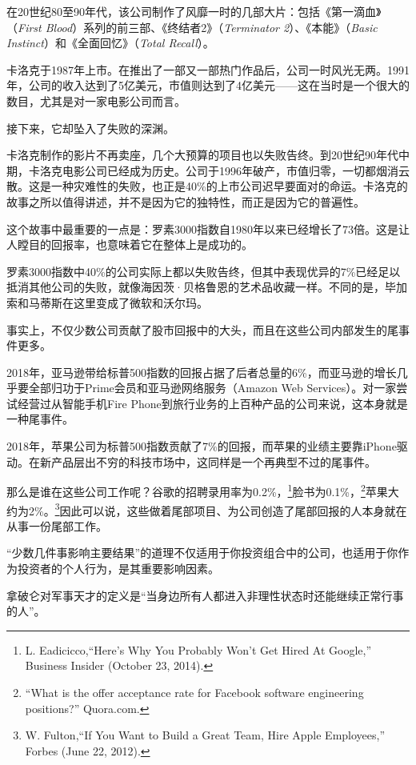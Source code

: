 在20世纪80至90年代，该公司制作了风靡一时的几部大片：包括《第一滴血》（\textit{First Blood}）系列的前三部、《终结者2》（\textit{Terminator 2}）、《本能》（\textit{Basic Instinct}）和《全面回忆》（\textit{Total Recall}）。

卡洛克于1987年上市。在推出了一部又一部热门作品后，公司一时风光无两。1991年，公司的收入达到了5亿美元，市值则达到了4亿美元——这在当时是一个很大的数目，尤其是对一家电影公司而言。

接下来，它却坠入了失败的深渊。

卡洛克制作的影片不再卖座，几个大预算的项目也以失败告终。到20世纪90年代中期，卡洛克电影公司已经成为历史。公司于1996年破产，市值归零，一切都烟消云散。这是一种灾难性的失败，也正是40\%的上市公司迟早要面对的命运。卡洛克的故事之所以值得讲述，并不是因为它的独特性，而正是因为它的普遍性。

这个故事中最重要的一点是：罗素3000指数自1980年以来已经增长了73倍。这是让人瞠目的回报率，也意味着它在整体上是成功的。

罗素3000指数中40\%的公司实际上都以失败告终，但其中表现优异的7\%已经足以抵消其他公司的失败，就像海因茨·贝格鲁恩的艺术品收藏一样。不同的是，毕加索和马蒂斯在这里变成了微软和沃尔玛。

事实上，不仅少数公司贡献了股市回报中的大头，而且在这些公司内部发生的尾事件更多。

2018年，亚马逊带给标普500指数的回报占据了后者总量的6\%，而亚马逊的增长几乎要全部归功于Prime会员和亚马逊网络服务（Amazon Web Services）。对一家尝试经营过从智能手机Fire Phone到旅行业务的上百种产品的公司来说，这本身就是一种尾事件。

2018年，苹果公司为标普500指数贡献了7\%的回报，而苹果的业绩主要靠iPhone驱动。在新产品层出不穷的科技市场中，这同样是一个再典型不过的尾事件。

那么是谁在这些公司工作呢？谷歌的招聘录用率为0.2\%，\footnote{L. Eadicicco,“Here’s Why You Probably Won’t Get Hired At Google,” Business Insider (October 23, 2014).}脸书为0.1\%，\footnote{“What is the offer acceptance rate for Facebook software engineering positions?” Quora.com.}苹果大约为2\%。\footnote{W. Fulton,“If You Want to Build a Great Team, Hire Apple Employees,” Forbes (June 22, 2012).}因此可以说，这些做着尾部项目、为公司创造了尾部回报的人本身就在从事一份尾部工作。

“少数几件事影响主要结果”的道理不仅适用于你投资组合中的公司，也适用于你作为投资者的个人行为，是其重要影响因素。

拿破仑对军事天才的定义是“当身边所有人都进入非理性状态时还能继续正常行事的人”。

